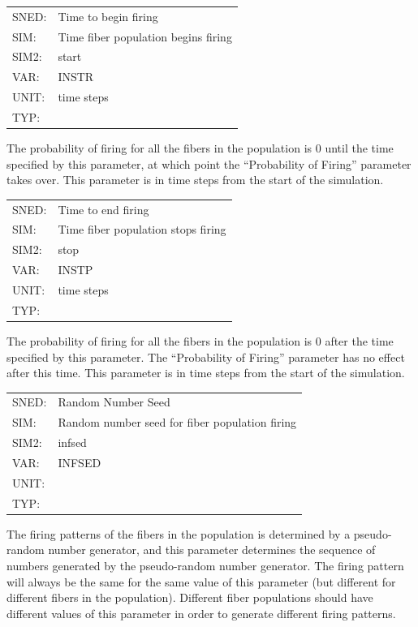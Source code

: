 \documentclass[12pt,openany,oneside]{book}
\begin{document}
\begin{flushleft}
\begin{tabular}{@{}ll@{}}
SNED: & Time to begin firing\\
SIM: & Time fiber population begins firing\\
SIM2: & start\\
VAR: & INSTR\\
UNIT: & time steps\\
TYP: &\\
\end{tabular}
\end{flushleft}
\noindent
The probability of firing for all the fibers in the population is 0
until the time specified by this parameter, at which point the
``Probability of Firing'' parameter takes over.  This parameter is in
time steps from the start of the simulation.
\filbreak
\vspace{\baselineskip}

\begin{flushleft}
\begin{tabular}{@{}ll@{}}
SNED: & Time to end firing\\
SIM: & Time fiber population stops firing\\
SIM2: & stop\\
VAR: & INSTP\\
UNIT: & time steps\\
TYP: &\\
\end{tabular}
\end{flushleft}
The probability of firing for all the fibers in the population is 0
after the time specified by this parameter.  The ``Probability of
Firing'' parameter has no effect after this time.  This parameter is
in time steps from the start of the simulation.
\noindent
\filbreak
\vspace{\baselineskip}

\begin{flushleft}
\begin{tabular}{@{}ll@{}}
SNED: & Random Number Seed\\
SIM: & Random number seed for fiber population firing\\
SIM2: & infsed\\
VAR: & INFSED\\
UNIT: &\\
TYP: &\\
\end{tabular}
\end{flushleft}
\noindent
The firing patterns of the fibers in the population is determined by a
pseudo-random number generator, and this parameter determines the
sequence of numbers generated by the pseudo-random number generator.
The firing pattern will always be the same for the same value of this
parameter (but different for different fibers in the population).
Different fiber populations should have different values of this
parameter in order to generate different firing patterns.
\filbreak
\vspace{\baselineskip}
\end{document}
